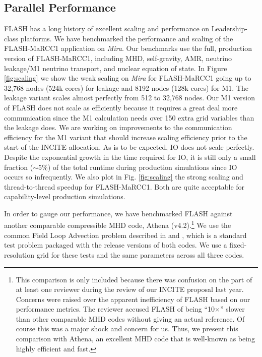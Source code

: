 

\subsection{Parallel Performance}
\label{sec:performance}


FLASH has a long history of excellent scaling and performance on Leadership-class platforms.
We have benchmarked the performance and scaling of the FLASH-MaRCC1 application on {\it Mira}.
Our benchmarks use the full, production version of FLASH-MaRCC1, including MHD, self-gravity, AMR, neutrino leakage/M1 neutrino transport, and nuclear equation of state.
In Figure \ref{fig:scaling} we show the weak scaling on {\it Mira} for FLASH-MaRCC1 going up to 32,768 nodes (524k cores) for leakage and 8192 nodes (128k cores) for M1.
The leakage variant scales almost perfectly from 512 to 32,768 nodes.
Our M1 version of FLASH does not scale as efficiently because it requires a great deal more communication since the M1 calculation needs over 150 extra grid variables than the leakage does.
We are working on improvements to the communication efficiency for the M1 variant that should increase scaling efficiency prior to the start of the INCITE allocation.
As is to be expected, IO does not scale perfectly.
Despite the exponential growth in the time required for IO, it is still only a small fraction ($\sim5\%$) of the total runtime during production simulations since IO occurs so infrequently.
We also plot in Fig. \ref{fig:scaling} the strong scaling and thread-to-thread speedup for FLASH-MaRCC1.
Both are quite acceptable for capability-level production simulations.


In order to gauge our performance, we have benchmarked FLASH against another comparable compressible MHD code, Athena (v4.2).\footnote{This comparison is only included because there was confusion on the part of at least one reviewer during the review of our INCITE proposal last year.
Concerns were raised over the apparent inefficiency of FLASH based on our performance metrics.
The reviewer accused FLASH of being ``10$\times$'' slower than other comparable MHD codes without giving an actual reference.
Of course this was a major shock and concern for us.
Thus, we present this comparison with Athena, an excellent MHD code that is well-known as being highly efficient and fast.
}
We use the common Field Loop Advection problem described in \citet{Gardiner:2008dh} and \citet{Lee:2009kq}, which is a standard test problem packaged with the release versions of both codes.  We use a fixed-resolution grid for these tests and the same parameters across all three codes.

